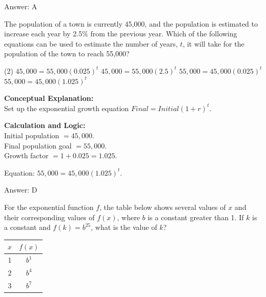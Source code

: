 \documentclass[11pt,paper=a4,answers]{exam}
\begin{document}
\begin{questions}
\begin{solution}
\vspace{25pt}

Answer: \colorbox{yellow!100}{A}
\end{solution}

\vspace{40pt}

\question
The population of a town is currently 45,000, and the population is estimated to increase each year by 2.5\% from the previous year. Which of the following equations can be used to estimate the number of years, $t$, it will take for the population of the town to reach 55,000?
\begin{tasks}(2)
    \task $45,000 = 55,000(0.025)^t$
    \task $45,000 = 55,000(2.5)^t$
    \task $55,000 = 45,000(0.025)^t$
    \task $55,000 = 45,000(1.025)^t$
\end{tasks}

\begin{solution}
\textbf{Conceptual Explanation:} \\
Set up the exponential growth equation $Final = Initial(1 + r)^t$.

\vspace{20pt}

\textbf{Calculation and Logic:} \\
Initial population $= 45,000$. \\
Final population goal $= 55,000$. \\
Growth factor $= 1 + 0.025 = 1.025$.

\vspace{10pt}

Equation: $55,000 = 45,000(1.025)^t$.

\vspace{25pt}

Answer: \colorbox{yellow!100}{D}
\end{solution}

\vspace{40pt}

\question
For the exponential function $f$, the table below shows several values of $x$ and their corresponding values of $f(x)$, where $b$ is a constant greater than 1. If $k$ is a constant and $f(k) = b^{25}$, what is the value of $k$?
\begin{center}
\begin{tabular}{|c|c|}
\hline
$x$ & $f(x)$ \\ \hline
1 & $b^1$ \\ \hline
2 & $b^4$ \\ \hline
3 & $b^7$ \\ \hline
\end{tabular}
\end{center}


\end{questions}
\end{document}
